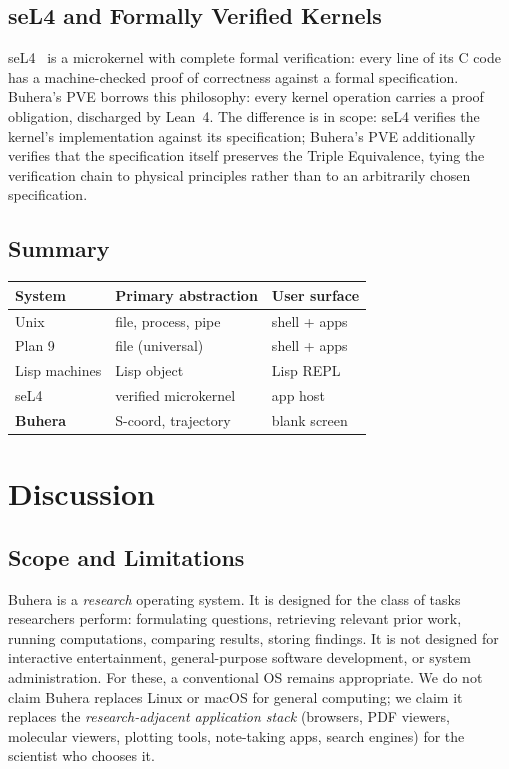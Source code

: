 \documentclass[11pt,twocolumn,a4paper]{article}
\begin{document}
\subsection{seL4 and Formally Verified Kernels}
seL4~\cite{klein2009sel4} is a microkernel with complete formal verification: every line of its C code has a machine-checked proof of correctness against a formal specification. Buhera's PVE borrows this philosophy: every kernel operation carries a proof obligation, discharged by Lean~4. The difference is in scope: seL4 verifies the kernel's implementation against its specification; Buhera's PVE additionally verifies that the specification itself preserves the Triple Equivalence, tying the verification chain to physical principles rather than to an arbitrarily chosen specification.

\subsection{Summary}
\begin{center}
\begin{tabular}{lll}
\toprule
\textbf{System} & \textbf{Primary abstraction} & \textbf{User surface} \\
\midrule
Unix & file, process, pipe & shell + apps \\
Plan 9 & file (universal) & shell + apps \\
Lisp machines & Lisp object & Lisp REPL \\
seL4 & verified microkernel & app host \\
\textbf{Buhera} & S-coord, trajectory & blank screen \\
\bottomrule
\end{tabular}
\end{center}


\section{Discussion}
\label{sec:discussion}

\subsection{Scope and Limitations}

Buhera is a \emph{research} operating system. It is designed for the class of tasks researchers perform: formulating questions, retrieving relevant prior work, running computations, comparing results, storing findings. It is not designed for interactive entertainment, general-purpose software development, or system administration. For these, a conventional OS remains appropriate. We do not claim Buhera replaces Linux or macOS for general computing; we claim it replaces the \emph{research-adjacent application stack} (browsers, PDF viewers, molecular viewers, plotting tools, note-taking apps, search engines) for the scientist who chooses it.
\end{document}
